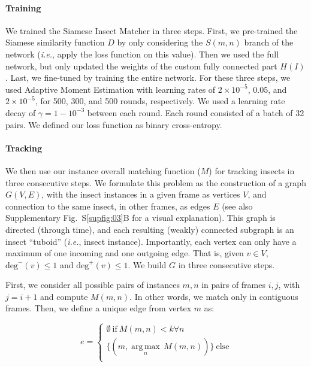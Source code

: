 \documentclass[12pt]{article}
\begin{document}
\begin{linenumbers}
		\paragraph{Training}
		We trained the Siamese Insect Matcher in three steps. First, we pre-trained the Siamese similarity function $D$ by only considering the $S(m,n)$ branch of the network (\emph{i.e.}, apply the loss function on this value). Then we used the full network, but only updated the weights of the custom fully connected part $H(I)$. Last, we fine-tuned by training the entire network. For these three steps, we used Adaptive Moment Estimation with learning rates of $2\times{}10^{-5}$, $0.05$, and $2\times{}10^{-5}$, for 500, 300, and 500 rounds, respectively. We used a learning rate decay of $\gamma = 1- 10^{-3}$ between each round. Each round consisted of a batch of 32 pairs. We defined our loss function as binary cross-entropy.

		\paragraph{Tracking}
		We then use our instance overall matching function ($M$) for tracking insects in three consecutive steps. We formulate this problem as the construction of a graph $G(V, E)$, with the insect instances in a given frame as vertices $V$, and connection to the same insect, in other frames, as edges $E$ (see also Supplementary Fig.~S\ref{supfig:03}B for a visual explanation). This graph is directed (through time), and each resulting (weakly) connected subgraph is an insect “tuboid” (\emph{i.e.}, insect instance). Importantly, each vertex can only have a maximum of one incoming and one outgoing edge. That is, given $v \in V$, $\text{deg}^-(v) \le 1$ and $\text{deg}^+(v) \le 1$. We build $G$ in three consecutive steps. 

		First, we consider all possible pairs of instances $m, n$ in pairs of frames $i, j$, with $j=i+1$ and compute $M(m,n)$. In other words, we match only in contiguous frames. Then, we define a unique edge from vertex $m$ as:

		\begin{equation}
			\label{eq:01}
			e = \begin{cases}
				\emptyset~\text{if}~M(m,n)<k \forall n \\
				\{(m, \underset{n}{\operatorname{arg\,max}}\,M(m,n))\}~\text{else} \\
			\end{cases}
		\end{equation}


\end{linenumbers}
\end{document}
